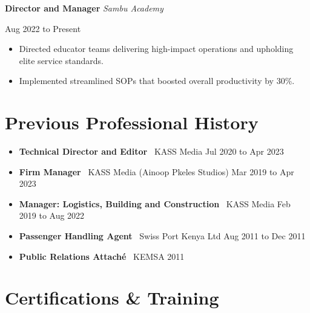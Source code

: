 \documentclass[10pt,a4paper]{article}
\newcommand{\role}[3]{%
  \par\vspace{0.55em}%
  {\sffamily\bfseries #1} \hfill {\small\itshape #2}%
  \par {\small #3}\par%
  \vspace{0.15em}%
}
\begin{document}
\role{Director and Manager}{Sambu Academy}{Aug 2022 to Present}
\begin{itemize}[leftmargin=1.5em]
  \item Directed educator teams delivering high-impact operations and upholding elite service standards.
  \item Implemented streamlined SOPs that boosted overall productivity by 30\%.
\end{itemize}

\section{Previous Professional History}

\begin{itemize}[leftmargin=1.5em]
  \item \textbf{Technical Director and Editor} \textbar\ KASS Media \hfill Jul 2020 to Apr 2023
  \item \textbf{Firm Manager} \textbar\ KASS Media (Ainoop Pkeles Studios) \hfill Mar 2019 to Apr 2023
  \item \textbf{Manager: Logistics, Building and Construction} \textbar\ KASS Media \hfill Feb 2019 to Aug 2022
  \item \textbf{Passenger Handling Agent} \textbar\ Swiss Port Kenya Ltd \hfill Aug 2011 to Dec 2011
  \item \textbf{Public Relations Attach\'{e}} \textbar\ KEMSA \hfill 2011
\end{itemize}

\section{Certifications \& Training}
\end{document}
